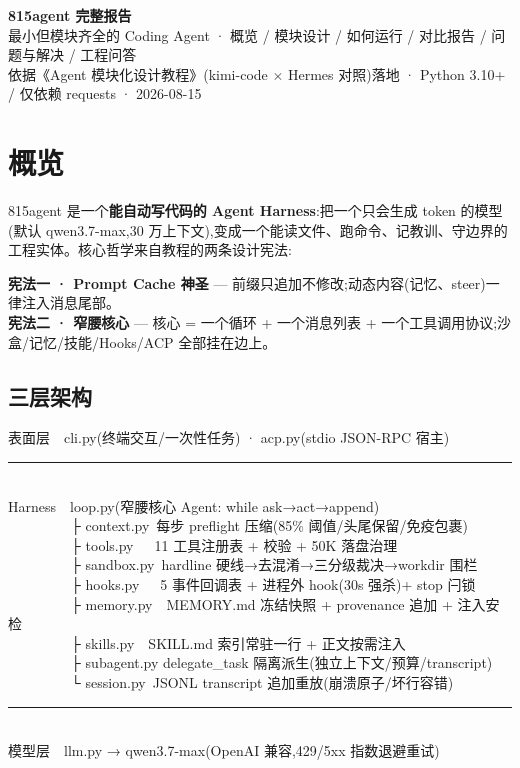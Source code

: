 \documentclass[10pt,a4paper]{article}
\makeatletter
\renewcommand{\small}{\fontsize{8}{11.5}\selectfont}
\renewcommand{\footnotesize}{\fontsize{7.5}{10.5}\selectfont}
\renewcommand{\LARGE}{\fontsize{18}{24}\selectfont}
\newenvironment{infobox}
{\par\vspace{4pt}\setlength{\fboxsep}{5pt}%
 \begin{lrbox}{\mdbox@tmp}\begin{minipage}{\dimexpr\linewidth-14pt\relax}\small}
{\end{minipage}\end{lrbox}%
 \noindent\fcolorbox{linec}{boxbg}{\usebox{\mdbox@tmp}}\par\vspace{3pt}}
\makeatother
\begin{document}
\begin{center}
  {\LARGE\bfseries\sffamily 815agent 完整报告}\\[5pt]
  {\small\color{dimc}最小但模块齐全的 Coding Agent · 概览 / 模块设计 / 如何运行 / 对比报告 / 问题与解决 / 工程问答}\\[3pt]
  {\footnotesize\color{dimc}依据《Agent 模块化设计教程》(kimi-code $\times$ Hermes 对照)落地 · Python 3.10+ / 仅依赖 requests · 2026-08-15}
\end{center}
\vspace{-2pt}
{\small\tableofcontents}
\vspace{4pt}

\section{概览}

815agent 是一个\textbf{能自动写代码的 Agent Harness}:把一个只会生成 token 的模型(默认 qwen3.7-max,30 万上下文),变成一个能读文件、跑命令、记教训、守边界的工程实体。核心哲学来自教程的两条设计宪法:

\begin{infobox}
\textbf{宪法一 · Prompt Cache 神圣} --- 前缀只追加不修改;动态内容(记忆、steer)一律注入消息尾部。\\
\textbf{宪法二 · 窄腰核心} --- 核心 = 一个循环 + 一个消息列表 + 一个工具调用协议;沙盒/记忆/技能/Hooks/ACP 全部挂在边上。
\end{infobox}

\subsection{三层架构}
{\footnotesize\ttfamily
表面层\ \ cli.py(终端交互/一次性任务) · acp.py(stdio JSON-RPC 宿主)\\
\rule{\linewidth}{0.4pt}\\
Harness\ \ loop.py(窄腰核心 Agent: while ask→act→append)\\
\ \ \ \ \ \ \ \ \ ├ context.py\ 每步 preflight 压缩(85\% 阈值/头尾保留/免疫包裹)\\
\ \ \ \ \ \ \ \ \ ├ tools.py\ \ \ 11 工具注册表 + 校验 + 50K 落盘治理\\
\ \ \ \ \ \ \ \ \ ├ sandbox.py\ hardline 硬线→去混淆→三分级裁决→workdir 围栏\\
\ \ \ \ \ \ \ \ \ ├ hooks.py\ \ \ 5 事件回调表 + 进程外 hook(30s 强杀)+ stop 闩锁\\
\ \ \ \ \ \ \ \ \ ├ memory.py\ \ MEMORY.md 冻结快照 + provenance 追加 + 注入安检\\
\ \ \ \ \ \ \ \ \ ├ skills.py\ \ SKILL.md 索引常驻一行 + 正文按需注入\\
\ \ \ \ \ \ \ \ \ ├ subagent.py delegate\_task 隔离派生(独立上下文/预算/transcript)\\
\ \ \ \ \ \ \ \ \ └ session.py\ JSONL transcript 追加重放(崩溃原子/坏行容错)\\
\rule{\linewidth}{0.4pt}\\
模型层\ \ llm.py → qwen3.7-max(OpenAI 兼容,429/5xx 指数退避重试)
}
\end{document}
